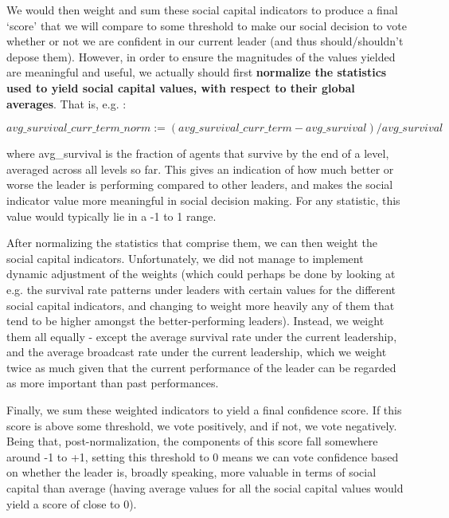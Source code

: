 We would then weight and sum these social capital indicators to produce a final `score' that we will compare to some threshold to make our social decision to vote whether or not we are confident in our current leader (and thus should/shouldn't depose them). However, in order to ensure the magnitudes of the values yielded are meaningful and useful, we actually should first \textbf{normalize the statistics used to yield social capital values, with respect to their global averages}. That is, e.g. : 

\begin{equation}
    avg\_survival\_curr\_term\_norm := (avg\_survival\_curr\_term-avg\_survival)/avg\_survival
\end{equation}

where avg\_survival is the fraction of agents that survive by the end of a level, averaged across all levels so far. This gives an indication of how much better or worse the leader is performing compared to other leaders, and makes the social indicator value more meaningful in social decision making. For any statistic, this value would typically lie in a -1 to 1 range. 

After normalizing the statistics that comprise them, we can then weight the social capital indicators. Unfortunately, we did not manage to implement dynamic adjustment of the weights (which could perhaps be done by looking at e.g. the survival rate patterns under leaders with certain values for the different social capital indicators, and changing to weight more heavily any of them that tend to be higher amongst the better-performing leaders). Instead, we weight them all equally - except the average survival rate under the current leadership, and the average broadcast rate under the current leadership, which we weight twice as much given that the current performance of the leader can be regarded as more important than past performances. 

Finally, we sum these weighted indicators to yield a final confidence score. If this score is above some threshold, we vote positively, and if not, we vote negatively. Being that, post-normalization, the components of this score fall somewhere around -1 to +1, setting this threshold to 0 means we can vote confidence based on whether the leader is, broadly speaking, more valuable in terms of social capital than average (having average values for all the social capital values would yield a score of close to 0).

